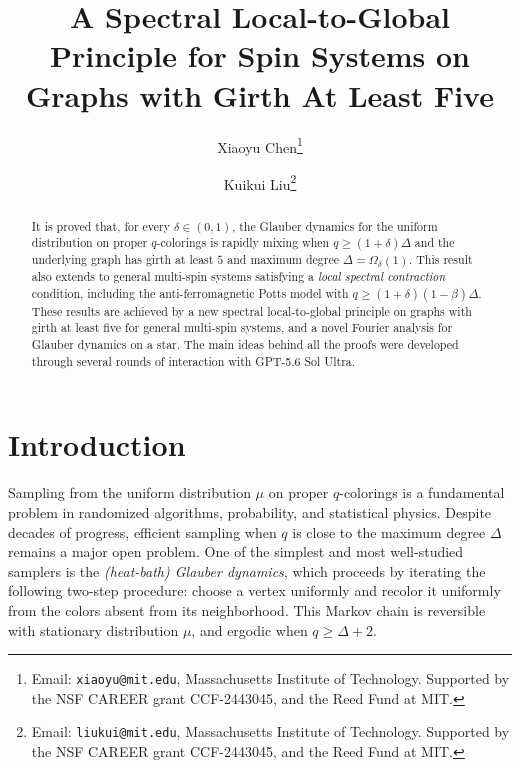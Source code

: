 \documentclass[a4paper,12pt]{article}
\title{A Spectral Local-to-Global Principle for Spin Systems on Graphs with Girth At Least Five}
\author{Xiaoyu Chen\thanks{Email: \texttt{xiaoyu@mit.edu}, 
Massachusetts Institute of Technology. Supported by the NSF CAREER grant CCF-2443045, and the Reed Fund at MIT.} \and Kuikui Liu\thanks{Email: \texttt{liukui@mit.edu}, 
Massachusetts Institute of Technology. Supported by the NSF CAREER grant CCF-2443045, and the Reed Fund at MIT.}}
\date{}
\theoremstyle{plain}
\theoremstyle{definition}
\def\-#1{\mathrm{#1}} %
\def\-#1{\mathrm{#1}} %
\newcommand{\DTV}[2]{\-D_{\mathrm{TV}}\left({#1},{#2}\right)}
\begin{document}
\maketitle

\begin{abstract}


It is proved that, for every $\delta \in (0,1)$, the Glauber dynamics for
the uniform distribution on proper $q$-colorings is rapidly mixing when
$q \geq (1+\delta)\Delta$ and the underlying graph has girth at least $5$
and maximum degree $\Delta = \Omega_\delta(1)$. 
This result also extends to general multi-spin systems satisfying a \emph{local spectral contraction} condition, including the anti-ferromagnetic Potts model with $q\geq (1+\delta)(1-\beta)\Delta$.
These results are achieved by a new spectral local-to-global principle on graphs with girth at least five for general multi-spin systems, and a novel Fourier analysis for Glauber dynamics on a star.
The main ideas behind all the proofs were developed through several rounds of interaction with GPT-5.6 Sol Ultra.
\end{abstract}

\clearpage
\tableofcontents
\clearpage

\section{Introduction}

Sampling from the uniform distribution $\mu$ on proper $q$-colorings is
a fundamental problem in randomized algorithms, probability, and
statistical physics.  Despite decades of progress, efficient sampling
when $q$ is close to the maximum degree $\Delta$ remains a major open problem. One of the simplest and most well-studied samplers is the \emph{(heat-bath) Glauber dynamics}, which proceeds by iterating the following two-step procedure: choose a
vertex uniformly and recolor it uniformly from the colors absent from its
neighborhood. This Markov chain is reversible with stationary distribution $\mu$, and ergodic when $q \geq \Delta + 2$.

\end{document}

